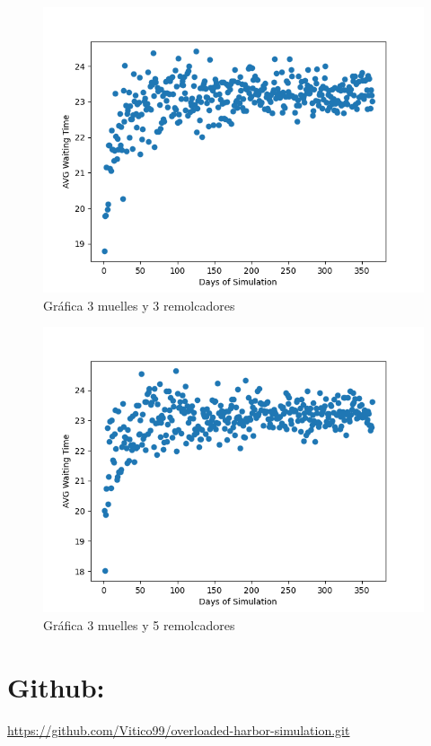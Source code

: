 \documentclass[titlepage,11pt]{scrartcl}
\begin{document}
	\begin{figure}[htb]
		\begin{center}
			\includegraphics[width=\columnwidth]{./g1.png}
		\end{center}
		\caption{Gr\'afica 3 muelles y 3 remolcadores}
	\end{figure}

	\begin{figure}[htb]
		\begin{center}
			\includegraphics[width=\columnwidth]{./g2.png}
		\end{center}
		\caption{Gr\'afica 3 muelles y 5 remolcadores}
	\end{figure}
	
\section{Github:}
	\url{https://github.com/Vitico99/overloaded-harbor-simulation.git}
\end{document}
